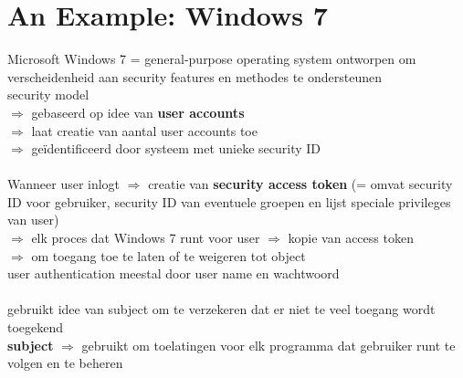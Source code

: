 \documentclass{report}
\begin{document}
\section{An Example: Windows 7}
Microsoft Windows 7 = general-purpose operating system ontworpen om verscheidenheid aan security features en methodes te ondersteunen
\\security model
\\$\Rightarrow$ gebaseerd op idee van \textbf{user accounts}
\\$\Rightarrow$ laat creatie van aantal user accounts toe 
\\$\Rightarrow$ ge\"identificeerd door systeem met unieke security ID
\\
\\Wanneer user inlogt $\Rightarrow$ creatie van \textbf{security access token} (= omvat security ID voor gebruiker, security ID van eventuele groepen en lijst speciale privileges van user)
\\$\Rightarrow$ elk proces dat Windows 7 runt voor user $\Rightarrow$ kopie van access token
\\$\Rightarrow$ om toegang toe te laten of te weigeren tot object
\\user authentication meestal door user name en wachtwoord
\\
\\gebruikt idee van subject om te verzekeren dat er niet te veel toegang wordt toegekend
\\\textbf{subject} $\Rightarrow$ gebruikt om toelatingen voor elk programma dat gebruiker runt te volgen en te beheren
\end{document}
